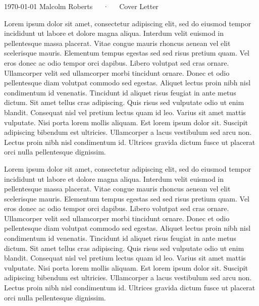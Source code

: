 \documentclass[11pt, a4paper]{awesome-cv}
\begin{document}
\makecvheader

\makecvfooter
{\today}
{Malcolm Roberts~~~·~~~Cover Letter}
{}

\makelettertitle

\begin{cvletter}

    Lorem ipsum dolor sit amet, consectetur adipiscing elit, sed do eiusmod tempor incididunt
    ut labore et dolore magna aliqua. Interdum velit euismod in pellentesque massa placerat.
    Vitae congue mauris rhoncus aenean vel elit scelerisque mauris. Elementum tempus egestas
    sed sed risus pretium quam. Vel eros donec ac odio tempor orci dapibus. Libero volutpat
    sed cras ornare. Ullamcorper velit sed ullamcorper morbi tincidunt ornare. Donec et odio
    pellentesque diam volutpat commodo sed egestas. Aliquet lectus proin nibh nisl condimentum
    id venenatis. Tincidunt id aliquet risus feugiat in ante metus dictum. Sit amet tellus cras
    adipiscing. Quis risus sed vulputate odio ut enim blandit. Consequat nisl vel pretium lectus
    quam id leo. Varius sit amet mattis vulputate. Nisi porta lorem mollis aliquam. Est lorem
    ipsum dolor sit. Suscipit adipiscing bibendum est ultricies. Ullamcorper a lacus vestibulum
    sed arcu non. Lectus proin nibh nisl condimentum id. Ultrices gravida dictum fusce ut placerat
    orci nulla pellentesque dignissim.

    Lorem ipsum dolor sit amet, consectetur adipiscing elit, sed do eiusmod tempor incididunt
    ut labore et dolore magna aliqua. Interdum velit euismod in pellentesque massa placerat.
    Vitae congue mauris rhoncus aenean vel elit scelerisque mauris. Elementum tempus egestas
    sed sed risus pretium quam. Vel eros donec ac odio tempor orci dapibus. Libero volutpat
    sed cras ornare. Ullamcorper velit sed ullamcorper morbi tincidunt ornare. Donec et odio
    pellentesque diam volutpat commodo sed egestas. Aliquet lectus proin nibh nisl condimentum
    id venenatis. Tincidunt id aliquet risus feugiat in ante metus dictum. Sit amet tellus cras
    adipiscing. Quis risus sed vulputate odio ut enim blandit. Consequat nisl vel pretium lectus
    quam id leo. Varius sit amet mattis vulputate. Nisi porta lorem mollis aliquam. Est lorem
    ipsum dolor sit. Suscipit adipiscing bibendum est ultricies. Ullamcorper a lacus vestibulum
    sed arcu non. Lectus proin nibh nisl condimentum id. Ultrices gravida dictum fusce ut placerat
    orci nulla pellentesque dignissim.


\end{cvletter}
\end{document}
